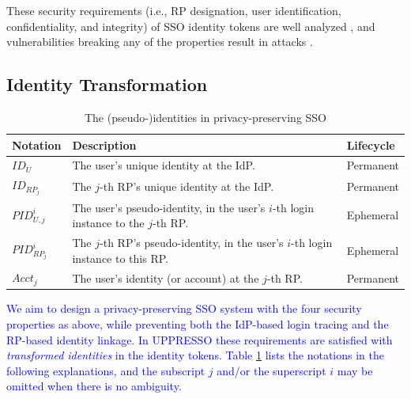 These security requirements (i.e., RP designation, user identification, confidentiality, and integrity) of SSO identity tokens
     are well analyzed \cite{ArmandoCCCT08,FettKS16, FettKS17},
     and
     vulnerabilities breaking any of the properties
            result in attacks \cite{SomorovskyMSKJ12, WangCW12, ArmandoCCCPS13, ZhouE14, WangZLLYLG15, WangZLG16, YangLLZH16, MainkaMS16, MainkaMSW17, YangLCZ18, YangLS17, ShiWL19, ChenPCTKT14, ccsSunB12, DiscoveringJCS, dimvaLiM16, CaoSBKVC14, TowardsShehabM14}.


\subsection{Identity Transformation}
\label{subsec:solutions}

\begin{table}[t]
\footnotesize
    \caption{The (pseudo-)identities in privacy-preserving SSO}
    \centering
    \begin{tabular}{|p{1.0cm}|p{5.1cm}|p{1.13cm}|} \hline
    {\textbf{Notation}} & {\textbf{Description}} & {\textbf{Lifecycle}} \\ \hline
    {$ID_U$} & {The user's unique identity at the IdP.} & {Permanent} \\ \hline
    {$ID_{RP_j}$} & {The $j$-th RP's unique identity at the IdP.} & {Permanent} \\ \hline
    {$PID_{U,j}^i$} & {The user's pseudo-identity, in the user's $i$-th login instance to the $j$-th RP.} & {Ephemeral} \\ \hline
    {$PID_{RP_j}^i$} & {The $j$-th RP's pseudo-identity, in the user's $i$-th login instance to this RP.} & {Ephemeral} \\ \hline
    {$Acct_j$} & {The user's identity (or account) at the $j$-th RP.} & {Permanent} \\ \hline
    \end{tabular}
    \label{tbl:notations-dilemma}
\end{table}


\textcolor{blue}{We aim to design a privacy-preserving SSO system with the four security properties as above,
    while preventing both the IdP-based login tracing and the RP-based identity linkage.
In UPPRESSO these requirements are satisfied with \emph{transformed identities} in the identity tokens.
Table \ref{tbl:notations-dilemma} lists the notations in the following explanations,
    and the subscript $j$ and/or the superscript $i$ may be omitted when there is no ambiguity.}

